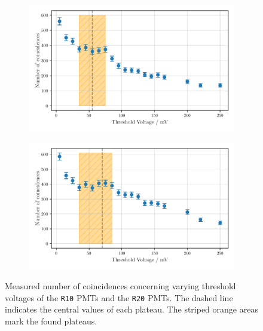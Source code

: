 \begin{figure}
    \centering
    \begin{subfigure}[b]{0.48\textwidth}
    \includegraphics[width=\textwidth]{plots/threshR20.pdf}
\end{subfigure}\hfill
\begin{subfigure}[b]{0.48\textwidth}
    \includegraphics[width=\textwidth]{plots/threshR10.pdf}
\end{subfigure}
\caption{Measured number of coincidences concerning varying threshold voltages
of the \texttt{R10} PMTs and the \texttt{R20} PMTs.
The dashed line indicates the central values of each plateau. The striped orange areas mark the found plateaus.}
\label{fig:threshR10R20}
\end{figure}
